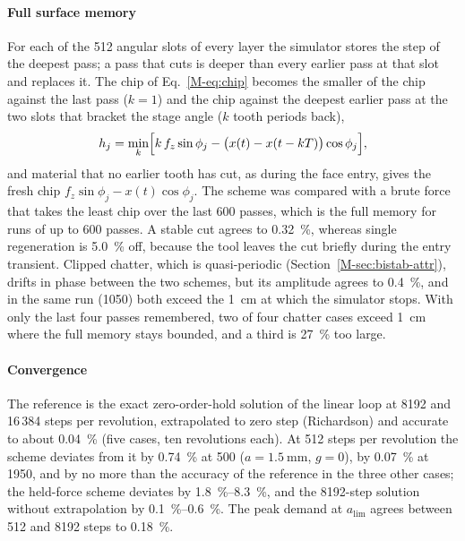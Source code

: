 \paragraph{Full surface memory}
For each of the 512 angular slots of every layer the simulator stores the step of the deepest pass; a pass that cuts is deeper than every earlier pass at that slot and replaces it. The chip of Eq.~\eqref{M-eq:chip} becomes the smaller of the chip against the last pass ($k=1$) and the chip against the deepest earlier pass at the two slots that bracket the stage angle ($k$ tooth periods back),
\begin{equation}\label{eq:surf}
  h_j=\min_{k}\Bigl[k\,f_z\sin\phi_j-\bigl(x(t)-x(t-kT)\bigr)\cos\phi_j\Bigr],
\end{equation}
and material that no earlier tooth has cut, as during the face entry, gives the fresh chip $f_z\sin\phi_j-x(t)\cos\phi_j$. The scheme was compared with a brute force that takes the least chip over the last 600 passes, which is the full memory for runs of up to 600 passes. A stable cut agrees to \SI{0.32}{\percent}, whereas single regeneration is \SI{5.0}{\percent} off, because the tool leaves the cut briefly during the entry transient. Clipped chatter, which is quasi-periodic (Section~\ref{M-sec:bistab-attr}), drifts in phase between the two schemes, but its amplitude agrees to \SI{0.4}{\percent}, and in the same run (\SI{1050}{\rpm}) both exceed the \SI{1}{\centi\metre} at which the simulator stops. With only the last four passes remembered, two of four chatter cases exceed \SI{1}{\centi\metre} where the full memory stays bounded, and a third is \SI{27}{\percent} too large.

\paragraph{Convergence}
The reference is the exact zero-order-hold solution of the linear loop at 8192 and 16\,384 steps per revolution, extrapolated to zero step (Richardson) and accurate to about \SI{0.04}{\percent} (five cases, ten revolutions each). At 512 steps per revolution the scheme deviates from it by \SI{0.74}{\percent} at \SI{500}{\rpm} ($a=\SI{1.5}{\milli\metre}$, $g=0$), by \SI{0.07}{\percent} at \SI{1950}{\rpm}, and by no more than the accuracy of the reference in the three other cases; the held-force scheme deviates by \SIrange{1.8}{8.3}{\percent}, and the 8192-step solution without extrapolation by \SIrange{0.1}{0.6}{\percent}. The peak demand at $a_{\lim}$ agrees between 512 and 8192 steps to \SI{0.18}{\percent}.

